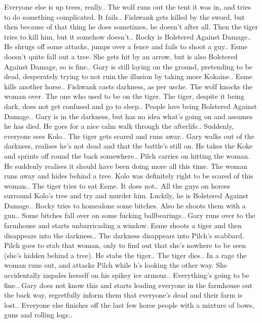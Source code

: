Everyone else is up trees, really..\medskip
The wolf runs out the tent it was in, and tries to do something complicated. It fails..\medskip
Fishwank gets killed by the sword, but then because of that thing he does sometimes, he doesn’t after all. Then the tiger tries to kill him, but it somehow doesn’t..\medskip
Rocky is Bolstered Against Damage..\medskip
He shrugs off some attacks, jumps over a fence and fails to shoot a guy..\medskip
Esme doesn’t quite fall out a tree. She gets hit by an arrow, but is also Bolstered Against Damage, so is fine..\medskip
Gary is still laying on the ground, pretending to be dead, desperately trying to not ruin the illusion by taking more Kokaine..\medskip
Esme kills another horse..\medskip
Fishwank casts darkness, as per usche. The wolf knocks the woman over. The one who used to be on the tiger. The tiger, despite it being dark, does not get confused and go to sleep..\medskip
People love being Bolstered Against Damage..\medskip
Gary is in the darkness, but has no idea what’s going on and assumes he has died. He goes for a nice calm walk through the afterlife..\medskip
Suddenly, everyone sees Kolo..\medskip
The tiger gets scared and runs away..\medskip
Gary walks out of the darkness, realises he’s not dead and that the battle’s still on. He takes the Koke and sprints off round the back somewhere..\medskip
Pilch carries on hitting the woman. He suddenly realises it should have been doing more all this time. The woman runs away and hides behind a tree. Kolo was definitely right to be scared of this woman..\medskip
The tiger tries to eat Esme. It does not..\medskip
All the guys on horses surround Kolo’s tree and try and murder him. Luckily, he is Bolstered Against Damage..\medskip
Rocky tries to homealone some bitches. Also he shoots them with a gun..\medskip
Some bitches fall over on some fucking ballbearings..\medskip
Gary runs over to the farmhouse and starts unbarricading a window. Esme shoots a tiger and then disappears into the darkness..\medskip
The darkness disappears into Pilch’s scabbard. Pilch goes to stab that woman, only to find out that she’s nowhere to be seen (she’s hidden behind a tree). He stabs the tiger..\medskip
The tiger dies..\medskip
In a rage the woman runs out, and attacks Pilch while h’s looking the other way. She accidentally impales herself on his spikey ice armour..\medskip
Everything’s going to be fine..\medskip
Gary does not know this and starts leading everyone in the farmhouse out the back way, regretfully inform them that everyone’s dead and their farm is lost..\medskip
Everyone else finishes off the last few horse people with a mixture of bows, guns and rolling logs..\medskip
